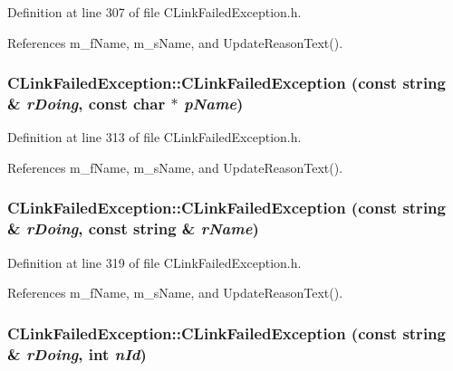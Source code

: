 Definition at line 307 of file CLink\-Failed\-Exception.h.

References m\_\-f\-Name, m\_\-s\-Name, and Update\-Reason\-Text().
\subsubsection{\setlength{\rightskip}{0pt plus 5cm}CLink\-Failed\-Exception::CLink\-Failed\-Exception (const string \& {\em r\-Doing}, const char $\ast$ {\em p\-Name})\hspace{0.3cm}{\tt  [inline]}}\label{classCLinkFailedException_a2}




Definition at line 313 of file CLink\-Failed\-Exception.h.

References m\_\-f\-Name, m\_\-s\-Name, and Update\-Reason\-Text().
\subsubsection{\setlength{\rightskip}{0pt plus 5cm}CLink\-Failed\-Exception::CLink\-Failed\-Exception (const string \& {\em r\-Doing}, const string \& {\em r\-Name})\hspace{0.3cm}{\tt  [inline]}}\label{classCLinkFailedException_a3}




Definition at line 319 of file CLink\-Failed\-Exception.h.

References m\_\-f\-Name, m\_\-s\-Name, and Update\-Reason\-Text().
\subsubsection{\setlength{\rightskip}{0pt plus 5cm}CLink\-Failed\-Exception::CLink\-Failed\-Exception (const string \& {\em r\-Doing}, int {\em n\-Id})\hspace{0.3cm}{\tt  [inline]}}\label{classCLinkFailedException_a4}




